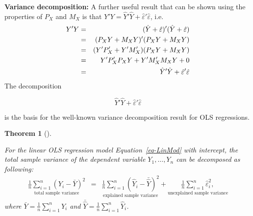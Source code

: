 \documentclass[
  letterpaper,
  DIV=11,
  numbers=noendperiod]{scrreprt}
\theoremstyle{definition}
\theoremstyle{plain}
\newtheorem{theorem}{Theorem}[chapter]
\theoremstyle{plain}
\theoremstyle{remark}
\begin{document}
\textbf{Variance decomposition:} A further useful result that can be
shown using the properties of \(P_X\) and \(M_X\) is that
\(Y'Y=\hat{Y}'\hat{Y}+\hat\varepsilon'\hat\varepsilon\), i.e.
\begin{eqnarray*}
Y'Y&=&(\hat Y+\hat\varepsilon)'(\hat Y+\hat\varepsilon)\notag\\
  &=&(P_XY+M_XY)'(P_XY+M_XY)\notag\\
  &=&(Y'P_X'+Y'M_X')(P_XY+M_XY)\notag\\
  &=&Y'P_X'P_XY+Y'M_X'M_XY+0\notag\\
  &=&\hat{Y}'\hat{Y}+\hat\varepsilon'\hat\varepsilon
\end{eqnarray*} The decomposition

\[
\hat{Y}'\hat{Y}+\hat\varepsilon'\hat\varepsilon
\]

is the basis for the well-known variance decomposition result for OLS
regressions.

\leavevmode{}%
\begin{theorem}[]\label{thm-vardecomp}

For the linear OLS regression model Equation~\ref{eq-LinMod} with
intercept, the total sample variance of the dependent variable
\(Y_1,\dots,Y_n\) can be decomposed as following: \begin{eqnarray}
\underset{\text{total sample variance}}{\frac{1}{n}\sum_{i=1}^n\left(Y_i-\bar{Y}\right)^2}&=&\underset{\text{explained sample variance}}{\frac{1}{n}\sum_{i=1}^n\left(\hat{Y}_i-\bar{\hat{Y}}\right)^2}+\underset{\text{unexplained sample variance}}{\frac{1}{n}\sum_{i=1}^n\hat\varepsilon_i^2,}\label{VarDecomp}
\end{eqnarray} where \(\bar{Y}=\frac{1}{n}\sum_{i=1}^nY_i\) and
\(\bar{\hat{Y}}=\frac{1}{n}\sum_{i=1}^n\hat{Y}_i\).

\end{theorem}
\end{document}

